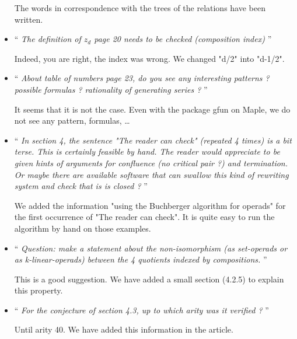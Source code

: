 \documentclass[11pt,reqno]{amsart}
\numberwithin{equation}{subsection}
\begin{document}
\begin{itemize}
The words in correspondence with the trees of the relations have been
written.
\medbreak

\item `` {\it
The definition of $z_d$ page 20 needs to be checked (composition index)
}''
\smallbreak

Indeed, you are right, the index was wrong. We changed "d/2" into
"d-1/2".
\medbreak

\item `` {\it
About table of numbers page 23, do you see any interesting patterns ?
possible formulas ? rationality of generating series ?
}''
\smallbreak

It seems that it is not the case. Even with the package gfun on
Maple, we do not see any pattern, formulas, \dots
\medbreak

\item `` {\it
In section 4, the sentence "The reader can check" (repeated 4 times)
is a bit terse. This is certainly feasible by hand. The reader would
appreciate to be given hints of arguments for confluence (no critical
pair ?) and termination. Or maybe there are available software that
can swallow this kind of rewriting system and check that is is closed ?
}''
\smallbreak

We added the information "using the Buchberger algorithm for operads" for
the first occurrence of "The reader can check". It is quite easy to run
the algorithm by hand on those examples.
\medbreak

\item `` {\it
Question: make a statement about the non-isomorphism (as set-operads
or as k-linear-operads) between the 4 quotients indexed by compositions.
}''
\smallbreak

This is a good suggestion. We have added a small section (4.2.5) to
explain this property.
\medbreak

\item `` {\it
For the conjecture of section 4.3, up to which arity was it verified ?
}''
\smallbreak

Until arity 40. We have added this information in the article.
\medbreak

\end{itemize}
\end{document}
